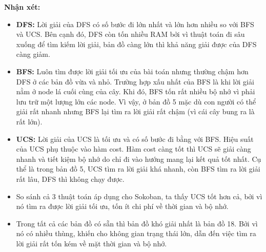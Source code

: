 \documentclass[12pt, letterpaper]{article}
\begin{document}
	\textbf{Nhận xét:}
	\begin{itemize}
		\item \textbf{DFS:} Lời giải của DFS có số bước đi lớn nhất và lớn hơn nhiều so với BFS và UCS. Bên cạnh đó, DFS còn tốn nhiều RAM bởi vì thuật toán đi sâu xuống để tìm kiếm lời giải, bản đồ càng lớn thì khả năng giải được của DFS càng giảm.
		\item \textbf{BFS:} Luôn tìm được lời giải tối ưu của bài toán nhưng thường chậm hơn DFS ở các bản đồ vừa và nhỏ. Trường hợp xấu nhất của BFS là khi lời giải nằm ở node lá cuối cùng của cây. Khi đó, BFS tốn rất nhiều bộ nhớ vì phải lưu trữ một lượng lớn các node. Vì vậy, ở bản đồ 5 mặc dù con người có thể giải rất nhanh nhưng BFS lại tìm ra lời giải rất chậm (vì cái cây bung ra là rất lớn).
		\item \textbf{UCS:} Lời giải của UCS là tối ưu và có số bước đi bằng với BFS. Hiệu suất của UCS phụ thuộc vào hàm cost. Hàm cost càng tốt thì UCS sẽ giải càng nhanh và tiết kiệm bộ nhớ do chỉ đi vào hướng mang lại kết quả tốt nhất. Cụ thể là trong bản đồ 5, UCS tìm ra lời giải khá nhanh, còn BFS tìm ra lời giải rất lâu, DFS thì không chạy được.
		\item So sánh cả 3 thuật toán áp dụng cho Sokoban, ta thấy UCS tốt hơn cả, bởi vì nó tìm ra được lời giải tối ưu, tốn ít chi phí về thời gian và bộ nhớ.
		\item Trong tất cả các bản đồ có sẵn thì bản đồ khó giải nhất là bản đồ 18.
		Bởi vì nó có nhiều thùng, khiến cho không gian trạng thái lớn, dẫn đến việc tìm ra lời giải
		rất tốn kém về mặt thời gian và bộ nhớ.
	\end{itemize}
\end{document}
